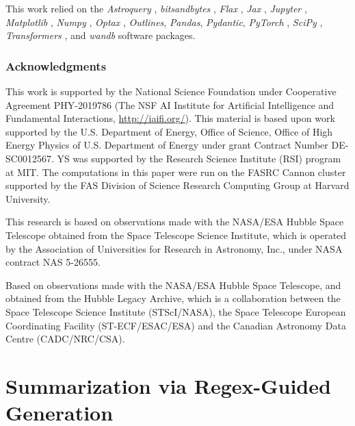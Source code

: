 \documentclass[10pt]{article} %
\newcommand{\package}[1]{\textsl{#1}\xspace}
\begin{document}
This work relied on the \package{Astroquery} \citep{2019AJ....157...98G}, \package{bitsandbytes} \citep{dettmers2022llmint8}, \package{Flax} \citep{flax2020github}, \package{Jax} \citep{jax2018github}, \package{Jupyter} \citep{Kluyver2016jupyter}, \package{Matplotlib} \citep{Hunter:2007}, \package{Numpy} \citep{harris2020array}, \package{Optax} \citep{deepmind2020jax}, \package{Outlines}, \package{Pandas}, \package{Pydantic}, \package{PyTorch} \citep{paszke2019pytorch}, \package{SciPy} \citep{2020SciPy-NMeth}, \package{Transformers} \citep{wolf2019huggingface}, and \package{wandb} \citep{wandb} software packages.



\subsubsection*{Acknowledgments}
This work is supported by the National Science Foundation under Cooperative Agreement PHY-2019786 (The NSF AI Institute for Artificial Intelligence and Fundamental Interactions, \url{http://iaifi.org/}). This material is based upon work supported by the U.S. Department of Energy, Office of Science, Office of High Energy Physics of U.S. Department of Energy under grant Contract Number  DE-SC0012567. YS was supported by the Research Science Institute (RSI) program at MIT. The computations in this paper were run on the FASRC Cannon cluster supported by the FAS Division of Science Research Computing Group at Harvard University.

This research is based on observations made with the NASA/ESA Hubble Space Telescope obtained from the Space Telescope Science Institute, which is operated by the Association of Universities for Research in Astronomy, Inc., under NASA contract NAS 5-26555.

Based on observations made with the NASA/ESA Hubble Space Telescope, and obtained from the Hubble Legacy Archive, which is a collaboration between the Space Telescope Science Institute (STScI/NASA), the Space Telescope European Coordinating Facility (ST-ECF/ESAC/ESA) and the Canadian Astronomy Data Centre (CADC/NRC/CSA).





\appendix
\section{Summarization via Regex-Guided Generation}
\label{app:summarization}
\end{document}
